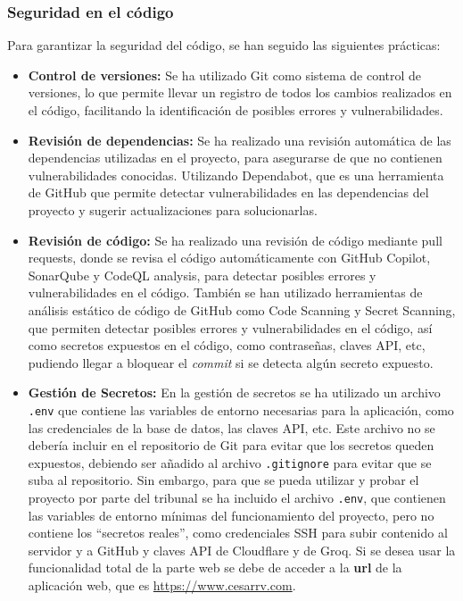 \subsubsection{Seguridad en el código}
Para garantizar la seguridad del código, se han seguido las siguientes prácticas:
\begin{itemize}
    \item \textbf{Control de versiones:} Se ha utilizado Git como sistema de control de versiones, lo que permite llevar un registro de todos los cambios realizados en el código, facilitando la identificación de posibles errores y vulnerabilidades.
    \item \textbf{Revisión de dependencias:} Se ha realizado una revisión automática de las dependencias utilizadas en el proyecto, para asegurarse de que no contienen vulnerabilidades conocidas. Utilizando Dependabot, que es una herramienta de GitHub que permite detectar vulnerabilidades en las dependencias del proyecto y sugerir actualizaciones para solucionarlas.

    \item \textbf{Revisión de código:} Se ha realizado una revisión de código mediante pull requests, donde se revisa el código automáticamente con GitHub Copilot, SonarQube y CodeQL analysis, para detectar posibles errores y vulnerabilidades en el código.
    También se han utilizado herramientas de análisis estático de código de GitHub como Code Scanning y Secret Scanning, que permiten detectar posibles errores y vulnerabilidades en el código, así como secretos expuestos en el código, como contraseñas, claves API, etc, pudiendo llegar a bloquear el \textit{commit} si se detecta algún secreto expuesto.

    \item \textbf{Gestión de Secretos:} En la gestión de secretos se ha utilizado un archivo \texttt{.env} que contiene las variables de entorno necesarias para la aplicación, como las credenciales de la base de datos, las claves API, etc. Este archivo no se debería incluir en el repositorio de Git para evitar que los secretos queden expuestos, debiendo ser añadido al archivo \texttt{.gitignore} para evitar que se suba al repositorio. Sin embargo, para que se pueda utilizar y probar el proyecto por parte del tribunal se ha incluido el archivo \texttt{.env}, que contienen las variables de entorno mínimas del funcionamiento del proyecto, pero no contiene los ``secretos reales'', como credenciales SSH para subir contenido al servidor y a GitHub y claves API de Cloudflare y de Groq. Si se desea usar la funcionalidad total de la parte web se debe de acceder a la \textbf{url} de la aplicación web, que es \url{https://www.cesarrv.com}.
\end{itemize}

